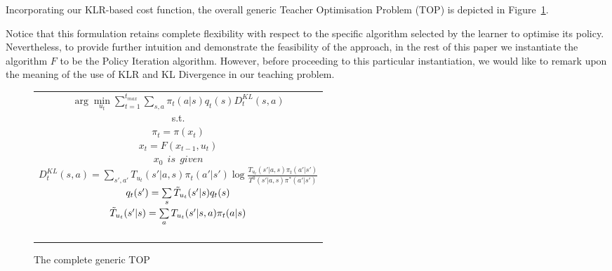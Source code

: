 Incorporating our KLR-based cost function, the overall generic Teacher
Optimisation Problem (TOP) is depicted in Figure~\ref{t_opt}. 

Notice that this formulation retains complete flexibility with respect
to the specific algorithm selected by the learner to optimise its
policy. Nevertheless, to provide further intuition and demonstrate the
feasibility of the approach, in the rest of this paper we instantiate
the algorithm $F$ to be the Policy Iteration algorithm. However,
before proceeding to this particular instantiation, we would like to
remark upon the meaning of the use of KLR and KL Divergence in our
teaching problem.

\begin{figure}[ht]
\begin{tabular}{|c|} \hline \parbox{3.2 in} {\center 
$\arg\min\limits_{u_t}\sum\limits_{t=1}^{t_{max}}\sum\limits_{s,a}\pi_t(a|s)q_t(s)D^{KL}_t(s,a)$\\
s.t.\\
$\pi_t=\pi(x_t)$\\
$x_t=F(x_{t-1},u_t)$\\
$x_0\ \ \displaystyle{is\ \ given}$\\
$D^{KL}_t(s,a)=\sum\limits_{s',a'}T_{u_t}(s'|a,s)\pi_t(a'|s')\log\frac{T_{u_t}(s'|a,s)\pi_t(a'|s')}{T^0(s'|a,s)\pi^*(a'|s')}$\\
$q_t(s')=\sum\limits_s\Tilde{T}_{u_t}(s'|s)q_t(s)$\\
$\Tilde{T}_{u_t}(s'|s)=\sum\limits_aT_{u_t}(s'|s,a)\pi_t(a|s)$\\\ \\
}\\ \hline \end{tabular}
\caption{\label{t_opt}The complete generic TOP}
\end{figure}

